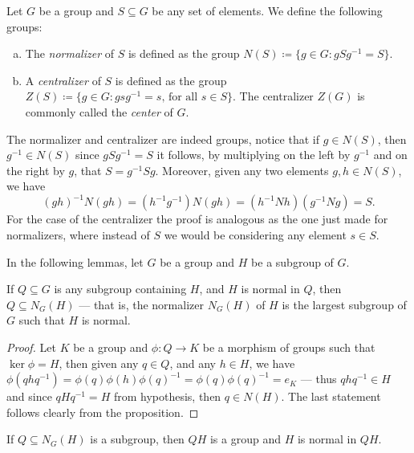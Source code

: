 \begin{definition}
\label{def:normalizer-centralizer}
Let \(G\) be a group and \(S \subseteq G\) be any set of elements. We define the
following groups:
\begin{enumerate}[(a)]\setlength\itemsep{0em}
\item The \emph{normalizer} of \(S\) is defined as the group \(N(S) \coloneq \{g
  \in G \colon g S g^{-1} = S\}\).
\item A \emph{centralizer} of \(S\) is defined as the group \(Z(S) \coloneq \{g
  \in G \colon g s g^{-1} = s \text{, for all } s \in S\}\). The centralizer
  \(Z(G)\) is commonly called the \emph{center} of \(G\).
\end{enumerate}
\end{definition}

The normalizer and centralizer are indeed groups, notice that if \(g \in N(S)\),
then \(g^{-1} \in N(S)\) since \(g S g^{-1} = S\) it follows, by multiplying on
the left by \(g^{-1}\) and on the right by \(g\), that \(S = g^{-1} S
g\). Moreover, given any two elements \(g, h \in N(S)\), we have
\[
  (g h)^{-1} N (g h) = (h^{-1} g ^{-1}) N (g h) = (h^{-1}N h) (g^{-1} N g) = S.
\]
For the case of the centralizer the proof is analogous as the one just made for
normalizers, where instead of \(S\) we would be considering any element \(s \in
S\).

In the following lemmas, let \(G\) be a group and \(H\) be a subgroup of \(G\).

\begin{lemma}
If \(Q \subseteq G\) is any subgroup containing \(H\), and \(H\) is normal in
\(Q\), then \(Q \subseteq N_G(H)\) --- that is, the normalizer \(N_G(H)\) of
\(H\) is the largest subgroup of \(G\) such that \(H\) is normal.
\end{lemma}

\begin{proof}
Let \(K\) be a group and \(\phi: Q \to K\) be a morphism of groups such that
\(\ker \phi = H\), then given any \(q \in Q\), and any \(h \in H\), we have
\(\phi(q h q^{-1}) = \phi(q) \phi(h) \phi(q)^{-1} = \phi(q) \phi(q)^{-1} = e_K\)
--- thus \(q h q^{-1} \in H\) and since \(q H q^{-1} = H\) from hypothesis, then
\(q \in N(H)\). The last statement follows clearly from the proposition.
\end{proof}

\begin{lemma}
If \(Q \subseteq N_G(H)\) is a subgroup, then \(Q H\) is a group and \(H\) is
normal in \(Q H\).
\end{lemma}

